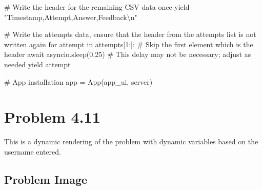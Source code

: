 \documentclass[
  letterpaper,
  DIV=11,
  numbers=noendperiod]{scrreprt}
\newenvironment{Shaded}{\begin{snugshade}}{\end{snugshade}}
\newcommand{\NormalTok}[1]{\textcolor[rgb]{0.00,0.23,0.31}{#1}}
\begin{document}
\begin{Shaded}
\begin{Highlighting}[]
\NormalTok{        \# Write the header for the remaining CSV data once}
\NormalTok{        yield "Timestamp,Attempt,Answer,Feedback\textbackslash{}n"}
        
\NormalTok{        \# Write the attempts data, ensure that the header from the attempts list is not written again}
\NormalTok{        for attempt in attempts[1:]:  \# Skip the first element which is the header}
\NormalTok{            await asyncio.sleep(0.25)  \# This delay may not be necessary; adjust as needed}
\NormalTok{            yield attempt}


\NormalTok{\# App installation}
\NormalTok{app = App(app\_ui, server)}
\end{Highlighting}
\end{Shaded}

\chapter*{Problem 4.11}\label{problem-4.11}


This is a dynamic rendering of the problem with dynamic variables based
on the username entered.

\section*{Problem Image}\label{problem-image-35}

\end{document}
